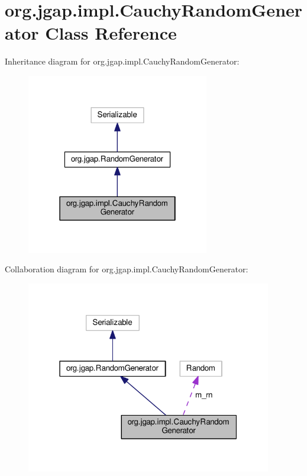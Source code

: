 \hypertarget{classorg_1_1jgap_1_1impl_1_1_cauchy_random_generator}{\section{org.\-jgap.\-impl.\-Cauchy\-Random\-Generator Class Reference}
\label{classorg_1_1jgap_1_1impl_1_1_cauchy_random_generator}
}


Inheritance diagram for org.\-jgap.\-impl.\-Cauchy\-Random\-Generator\-:
\nopagebreak
\begin{figure}[H]
\begin{center}
\leavevmode
\includegraphics[width=226pt]{classorg_1_1jgap_1_1impl_1_1_cauchy_random_generator__inherit__graph}
\end{center}
\end{figure}


Collaboration diagram for org.\-jgap.\-impl.\-Cauchy\-Random\-Generator\-:
\nopagebreak
\begin{figure}[H]
\begin{center}
\leavevmode
\includegraphics[width=304pt]{classorg_1_1jgap_1_1impl_1_1_cauchy_random_generator__coll__graph}
\end{center}
\end{figure}
